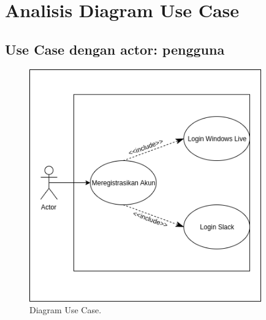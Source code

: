 \section{Analisis Diagram Use Case}
\subsection{Use Case dengan actor: pengguna}
\begin{figure}[h]
  \includegraphics[width=10cm]{./Gambar/usecase.png}
  \centering
  \caption{Diagram Use Case.}
  \label{fig:usecase}
\end{figure}

